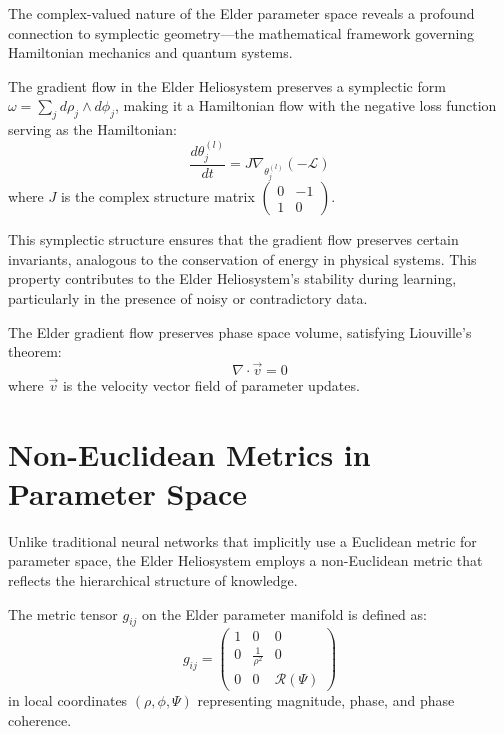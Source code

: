 The complex-valued nature of the Elder parameter space reveals a profound connection to symplectic geometry—the mathematical framework governing Hamiltonian mechanics and quantum systems.

\begin{theorem}
The gradient flow in the Elder Heliosystem preserves a symplectic form $\omega = \sum_j d\rho_j \wedge d\phi_j$, making it a Hamiltonian flow with the negative loss function serving as the Hamiltonian:
\begin{equation}
\frac{d\theta^{(l)}_j}{dt} = J \nabla_{\theta^{(l)}_j} (-\mathcal{L})
\end{equation}
where $J$ is the complex structure matrix $\begin{pmatrix} 0 & -1 \\ 1 & 0 \end{pmatrix}$.
\end{theorem}

This symplectic structure ensures that the gradient flow preserves certain invariants, analogous to the conservation of energy in physical systems. This property contributes to the Elder Heliosystem's stability during learning, particularly in the presence of noisy or contradictory data.

\begin{corollary}
The Elder gradient flow preserves phase space volume, satisfying Liouville's theorem:
\begin{equation}
\nabla \cdot \vec{v} = 0
\end{equation}
where $\vec{v}$ is the velocity vector field of parameter updates.
\end{corollary}

\section{Non-Euclidean Metrics in Parameter Space}

Unlike traditional neural networks that implicitly use a Euclidean metric for parameter space, the Elder Heliosystem employs a non-Euclidean metric that reflects the hierarchical structure of knowledge.

\begin{definition}
The metric tensor $g_{ij}$ on the Elder parameter manifold is defined as:
\begin{equation}
g_{ij} = \begin{pmatrix} 
1 & 0 & 0 \\
0 & \frac{1}{\rho^2} & 0 \\
0 & 0 & \mathcal{R}(\Psi)
\end{pmatrix}
\end{equation}
in local coordinates $(\rho, \phi, \Psi)$ representing magnitude, phase, and phase coherence.
\end{definition}

